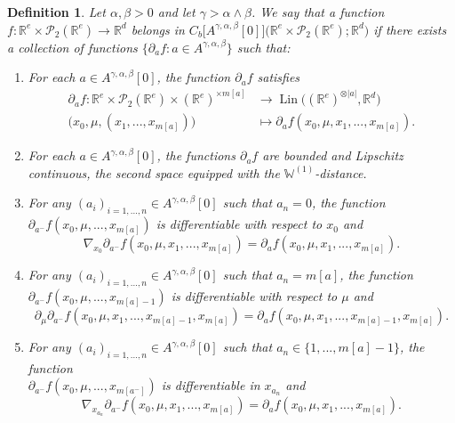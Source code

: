 \documentclass[a4paper,11pt,twoside]{article}
\numberwithin{equation}{section}
\theoremstyle{plain}
\newtheorem{definition}[theorem]{Definition}
\newcommand{\bR}{\mathbb{R}}
\newcommand{\bW}{\mathbb{W}}
\newcommand{\cP}{\mathcal{P}}
\DeclareMathOperator{\lin}{Lin}
\newcommand{\1}{\mathbbm{1}}
\begin{document}
	\begin{definition}
		\label{def:general:Lions-spatial:derivative}
		Let $\alpha, \beta>0$ and let $\gamma > \alpha \wedge \beta$. We say that a function $f: \bR^e \times \cP_2(\bR^e) \to \bR^d$ belongs in $C_b\big[ A^{\gamma, \alpha, \beta}[0] \big]\big(\bR^e \times \cP_2(\bR^e); \bR^d\big)$ if there exists a collection of functions $\big\{ \partial_a f: a\in A^{\gamma, \alpha, \beta} \big\}$ such that:
		\begin{enumerate}
			\item For each $a\in A^{\gamma, \alpha, \beta}[0]$, the function $\partial_a f$ satisfies
			\begin{align*}
				\partial_a f : \bR^e \times \cP_2(\bR^e) \times (\bR^e)^{\times m[a]} &\to \lin\big( (\bR^e)^{\otimes |a|},  \bR^d\big)
				\\
				\big( x_0, \mu, (x_1, ..., x_{m[a]}) \big) &\mapsto \partial_a f(x_0, \mu, x_1, ..., x_{m[a]}).
			\end{align*} 
			\item For each $a\in A^{\gamma, \alpha, \beta}[0]$, the functions $\partial_a f$ are bounded and Lipschitz continuous, the second space equipped with the $\bW^{(1)}$-distance. 
			\item For any $(a_i)_{i=1, ..., n} \in A^{\gamma, \alpha, \beta}[0]$ such that $a_n = 0$, the function $\partial_{a^-} f(x_0, \mu, ..., x_{m[a]})$ is differentiable with respect to $x_0$ and 
			$$
			\nabla_{x_0} \partial_{a^-} f(x_0, \mu, x_1, ..., x_{m[a]}) = \partial_a f (x_0, \mu, x_1, ..., x_{m[a]}) . 
			$$
			\item For any $(a_i)_{i=1, ..., n} \in A^{\gamma, \alpha, \beta}[0]$ such that $a_n = m[a]$, the function $\partial_{a^-} f(x_0, \mu, ..., x_{m[a]-1})$ is differentiable with respect to $\mu$ and
			$$
			\partial_\mu \partial_{a^-} f(x_0, \mu, x_1, ..., x_{m[a]-1}, x_{m[a]}) = \partial_a f(x_0, \mu, x_1, ..., x_{m[a]-1}, x_{m[a]}). 
			$$
			\item For any $(a_i)_{i=1, ..., n} \in A^{\gamma, \alpha, \beta}[0]$ such that $a_n \in \{1, ..., m[a]-1\}$, the function \\ $\partial_{a^-} f(x_0, \mu, ..., x_{m[a^-]})$ is differentiable in $x_{a_n}$ and 
			$$
			\nabla_{x_{a_n}} \partial_{a^-} f(x_0, \mu, x_1, ..., x_{m[a]}) = \partial_a f(x_0, \mu, x_1, ..., x_{m[a]}). 
			$$
		\end{enumerate}
	\end{definition}
	
\end{document}
